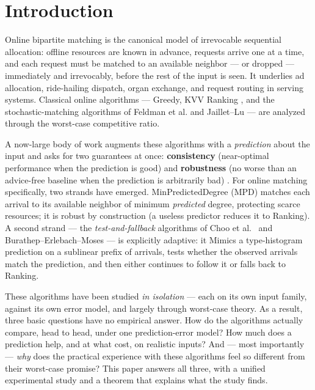 \section{Introduction}

Online bipartite matching is the canonical model of irrevocable
sequential allocation: offline resources are known in advance, requests
arrive one at a time, and each request must be matched to an available
neighbor --- or dropped --- immediately and irrevocably, before the rest
of the input is seen. It underlies ad allocation, ride-hailing dispatch,
organ exchange, and request routing in serving systems. Classical online
algorithms --- Greedy, KVV Ranking \cite{kvv1990ranking}, and the
stochastic-matching algorithms of Feldman et al.
\cite{feldman2009online} and Jaillet--Lu \cite{jailletlu2014online} ---
are analyzed through the worst-case competitive ratio.

A now-large body of work augments these algorithms with a
\emph{prediction} about the input and asks for two guarantees at once:
\textbf{consistency} (near-optimal performance when the prediction is
good) and \textbf{robustness} (no worse than an advice-free baseline
when the prediction is arbitrarily bad)
\cite{lykouris2018caching,weizhang2020tradeoffs}. For online matching
specifically, two strands have emerged. MinPredictedDegree (MPD)
\cite{aci2022mpd} matches each arrival to its available neighbor of
minimum \emph{predicted} degree, protecting scarce resources; it is
robust by construction (a useless predictor reduces it to Ranking). A
second strand --- the \emph{test-and-fallback} algorithms of Choo et
al.~\cite{choo2024imperfect} and Burathep--Erlebach--Moses
\cite{bem2026testmatch} --- is explicitly adaptive: it Mimics a
type-histogram prediction on a sublinear prefix of arrivals, tests
whether the observed arrivals match the prediction, and then either
continues to follow it or falls back to Ranking.

These algorithms have been studied \emph{in isolation} --- each on its
own input family, against its own error model, and largely through
worst-case theory. As a result, three basic questions have no empirical
answer. How do the algorithms actually compare, head to head, under one
prediction-error model? How much does a prediction help, and at what
cost, on realistic inputs? And --- most importantly --- \emph{why} does
the practical experience with these algorithms feel so different from
their worst-case promise? This paper answers all three, with a unified
experimental study and a theorem that explains what the study finds.

